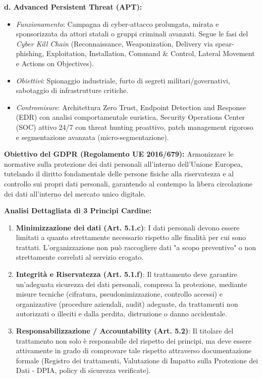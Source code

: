 \documentclass[11pt,a4paper]{article}
\begin{document}
\begin{solutionbox}
\textbf{d. Advanced Persistent Threat (APT):}
\begin{itemize}
    \item \textit{Funzionamento}: Campagna di cyber-attacco prolungata, mirata e sponsorizzata da attori statali o gruppi criminali avanzati. Segue le fasi del \textit{Cyber Kill Chain} (Reconnaissance, Weaponization, Delivery via spear-phishing, Exploitation, Installation, Command \& Control, Lateral Movement e Actions on Objectives).
    \item \textit{Obiettivi}: Spionaggio industriale, furto di segreti militari/governativi, sabotaggio di infrastrutture critiche.
    \item \textit{Contromisure}: Architettura Zero Trust, Endpoint Detection and Response (EDR) con analisi comportamentale euristica, Security Operations Center (SOC) attivo 24/7 con threat hunting proattivo, patch management rigoroso e segmentazione avanzata (micro-segmentazione).
\end{itemize}
\end{solutionbox}

\begin{solutionbox}
\textbf{Obiettivo del GDPR (Regolamento UE 2016/679):}
Armonizzare le normative sulla protezione dei dati personali all'interno dell'Unione Europea, tutelando il diritto fondamentale delle persone fisiche alla riservatezza e al controllo sui propri dati personali, garantendo al contempo la libera circolazione dei dati all'interno del mercato unico digitale.

\textbf{Analisi Dettagliata di 3 Principi Cardine:}
\begin{enumerate}
    \item \textbf{Minimizzazione dei dati (Art. 5.1.c)}: I dati personali devono essere limitati a quanto strettamente necessario rispetto alle finalit\`a per cui sono trattati. L'organizzazione non pu\`o raccogliere dati "a scopo preventivo" o non strettamente correlati al servizio erogato.
    \item \textbf{Integrit\`a e Riservatezza (Art. 5.1.f)}: Il trattamento deve garantire un'adeguata sicurezza dei dati personali, compresa la protezione, mediante misure tecniche (cifratura, pseudonimizzazione, controllo accessi) e organizzative (procedure aziendali, audit) adeguate, da trattamenti non autorizzati o illeciti e dalla perdita, distruzione o danno accidentale.
    \item \textbf{Responsabilizzazione / Accountability (Art. 5.2)}: Il titolare del trattamento non solo \`e responsabile del rispetto dei principi, ma deve essere attivamente in grado di comprovare tale rispetto attraverso documentazione formale (Registro dei trattamenti, Valutazione di Impatto sulla Protezione dei Dati - DPIA, policy di sicurezza verificate).
\end{enumerate}
\end{solutionbox}
\end{document}
